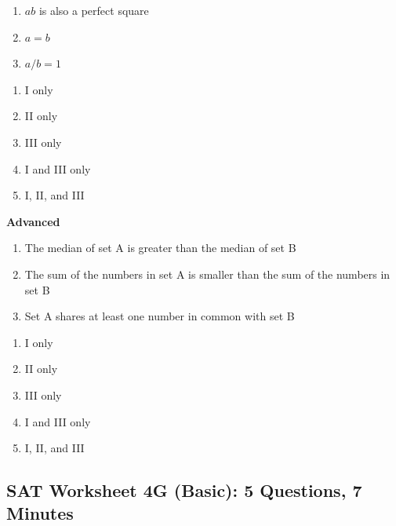 \documentclass[12pt]{book}
\newcommand{\advanced}{\textbf{Advanced} }
\begin{document}
\begin{multienumerate}
{\begin{enumerate}[label=\Roman*.]
\item $ab$ is also a perfect square
\item $a=b$
\item $a/b=1$
\end{enumerate}

\begin{enumerate}[label=(\Alph*)]
\item I only
\item II only
\item III only
\item I and III only
\item I, II, and III
\end{enumerate}}{\advanced

\begin{enumerate}[label=\Roman*.]
\item The median of set A is greater than the median of set B
\item The sum of the numbers in set A is smaller than the sum of the numbers in set B
\item Set A shares at least one number in common with set B
\end{enumerate}

\begin{enumerate}[label=(\Alph*)]
\item I only
\item II only
\item III only
\item I and III only
\item I, II, and III
\end{enumerate}}
\end{multienumerate}

\newpage
\subsection{SAT Worksheet 4G (Basic): 5 Questions, 7 Minutes}
\end{document}
